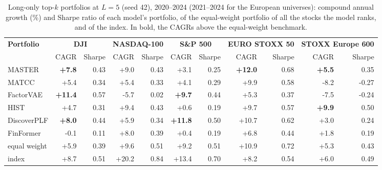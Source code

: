 \begin{table}[htbp]
\centering
\small
\begin{adjustbox}{max width=\textwidth}
\begin{tabular}{@{}lrrrrrrrrrr@{}}
\toprule
\textbf{Portfolio} & \multicolumn{2}{c}{\textbf{DJI}} & \multicolumn{2}{c}{\textbf{NASDAQ-100}} & \multicolumn{2}{c}{\textbf{S\&P 500}} & \multicolumn{2}{c}{\textbf{EURO STOXX 50}} & \multicolumn{2}{c}{\textbf{STOXX Europe 600}} \\
\cmidrule(lr){2-3} \cmidrule(lr){4-5} \cmidrule(lr){6-7} \cmidrule(lr){8-9} \cmidrule(lr){10-11}
 & CAGR & Sharpe & CAGR & Sharpe & CAGR & Sharpe & CAGR & Sharpe & CAGR & Sharpe \\
\midrule
MASTER & \textbf{+7.8} & 0.43 & +9.0 & 0.43 & +3.1 & 0.25 & \textbf{+12.0} & 0.68 & \textbf{+5.5} & 0.35 \\
MATCC & +5.4 & 0.34 & +5.4 & 0.33 & +4.1 & 0.29 & +9.9 & 0.58 & -8.2 & -0.27 \\
FactorVAE & \textbf{+11.4} & 0.57 & -5.7 & 0.02 & \textbf{+9.7} & 0.44 & +5.3 & 0.37 & -7.5 & -0.24 \\
HIST & +4.7 & 0.31 & +9.4 & 0.43 & +0.6 & 0.19 & +9.7 & 0.57 & \textbf{+9.9} & 0.50 \\
DiscoverPLF & \textbf{+8.0} & 0.44 & +5.9 & 0.34 & \textbf{+11.8} & 0.50 & +10.7 & 0.62 & +3.0 & 0.24 \\
FinFormer & -0.1 & 0.11 & +8.0 & 0.39 & +0.4 & 0.19 & +6.8 & 0.44 & +1.8 & 0.19 \\
\midrule
equal weight & +5.9 & 0.39 & +9.6 & 0.51 & +9.2 & 0.51 & +10.9 & 0.72 & +5.3 & 0.43 \\
index & +8.7 & 0.51 & +20.2 & 0.84 & +13.4 & 0.70 & +8.2 & 0.54 & +6.0 & 0.49 \\
\bottomrule
\end{tabular}
\end{adjustbox}
\caption{Long-only top-$k$ portfolios at $L = 5$ (seed 42), 2020--2024 (2021--2024 for the European universes): compound annual growth (\%) and Sharpe ratio of each model's portfolio, of the equal-weight portfolio of all the stocks the model ranks, and of the index. In bold, the CAGRs above the equal-weight benchmark.}
\label{tab:pf_performance}
\end{table}
